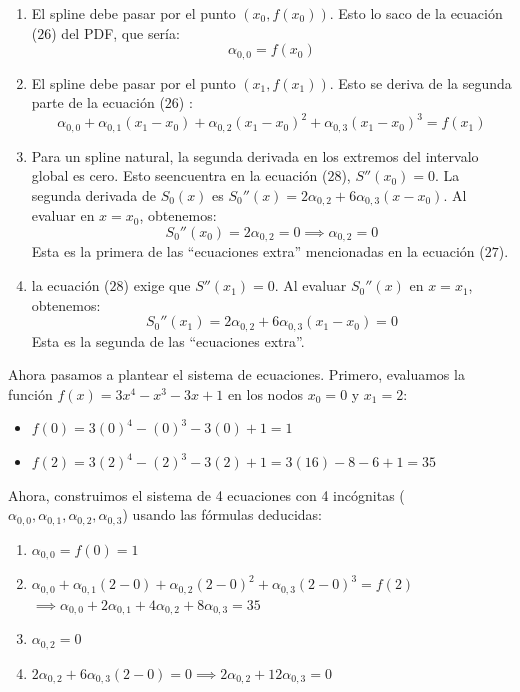 \documentclass{article}
\begin{document}
\begin{enumerate}
    \item El spline debe pasar por el punto \((x_0, f(x_0))\). Esto lo saco de la ecuación ($26$) del PDF, que sería:
    $$ \alpha_{0,0} = f(x_0) $$

    \item El spline debe pasar por el punto \((x_1, f(x_1))\). Esto se deriva de la segunda parte de la ecuación ($26$) :
    $$ \alpha_{0,0} + \alpha_{0,1}(x_1-x_0) + \alpha_{0,2}(x_1-x_0)^2 + \alpha_{0,3}(x_1-x_0)^3 = f(x_1) $$

    \item Para un spline natural, la segunda derivada en los extremos del intervalo global es cero. Esto seencuentra en la ecuación ($28$), \(S''(x_0) = 0\). La segunda derivada de \(S_0(x)\) es \(S_0''(x) = 2\alpha_{0,2} + 6\alpha_{0,3}(x-x_0)\). Al evaluar en \(x=x_0\), obtenemos:
    $$ S_0''(x_0) = 2\alpha_{0,2} = 0 \implies \alpha_{0,2} = 0 $$
    Esta es la primera de las ``ecuaciones extra'' mencionadas en la ecuación ($27$).

    \item la ecuación ($28$) exige que \(S''(x_1) = 0\). Al evaluar \(S_0''(x)\) en \(x=x_1\), obtenemos:
    $$ S_0''(x_1) = 2\alpha_{0,2} + 6\alpha_{0,3}(x_1-x_0) = 0 $$
    Esta es la segunda de las ``ecuaciones extra''.
\end{enumerate}


Ahora pasamos a plantear el sistema de ecuaciones.
Primero, evaluamos la función \(f(x) = 3x^4 - x^3 - 3x + 1\) en los nodos \(x_0=0\) y \(x_1=2\):
\begin{itemize}
    \item \(f(0) = 3(0)^4 - (0)^3 - 3(0) + 1 = 1\)
    \item \(f(2) = 3(2)^4 - (2)^3 - 3(2) + 1 = 3(16) - 8 - 6 + 1 = 35\)
\end{itemize}

Ahora, construimos el sistema de 4 ecuaciones con 4 incógnitas (\(\alpha_{0,0}, \alpha_{0,1}, \alpha_{0,2}, \alpha_{0,3}\)) usando las fórmulas deducidas:
\begin{enumerate}
    \item \(\alpha_{0,0} = f(0) = 1\)
    \item \(\alpha_{0,0} + \alpha_{0,1}(2-0) + \alpha_{0,2}(2-0)^2 + \alpha_{0,3}(2-0)^3 = f(2)\) \\
    \(\implies \alpha_{0,0} + 2\alpha_{0,1} + 4\alpha_{0,2} + 8\alpha_{0,3} = 35\)
    \item \(\alpha_{0,2} = 0 \)
    \item \(2\alpha_{0,2} + 6\alpha_{0,3}(2-0) = 0 \implies 2\alpha_{0,2} + 12\alpha_{0,3} = 0\)
\end{enumerate}
\end{document}
